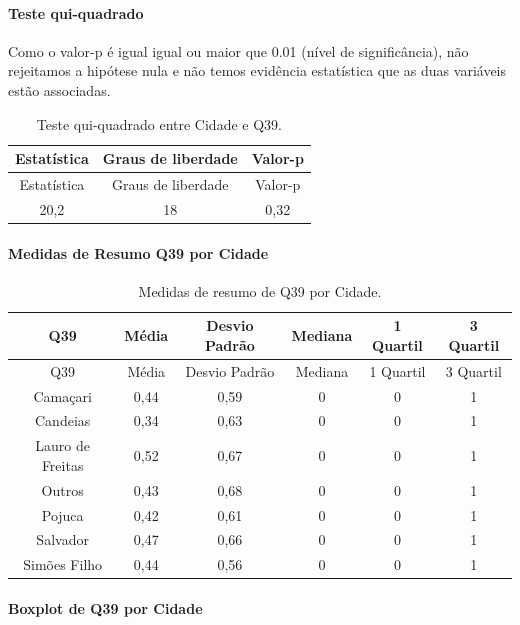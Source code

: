 \documentclass[]{article}
\let\oldparagraph\paragraph
\renewcommand{\paragraph}[1]{\oldparagraph{#1}\mbox{}}
\begin{document}
\hypertarget{teste-qui-quadrado-127}{%
\paragraph{Teste qui-quadrado}\label{teste-qui-quadrado-127}}

Como o valor-p é igual igual ou maior que 0.01 (nível de significância), não rejeitamos a hipótese nula e não temos evidência estatística que as duas variáveis estão associadas.

\begin{longtable}[]{@{}ccc@{}}
\caption{\label{tab:unnamed-chunk-1491}Teste qui-quadrado entre Cidade e Q39.}\tabularnewline
\toprule
Estatística & Graus de liberdade & Valor-p\tabularnewline
\midrule
\endfirsthead
\toprule
Estatística & Graus de liberdade & Valor-p\tabularnewline
\midrule
\endhead
20,2 & 18 & 0,32\tabularnewline
\bottomrule
\end{longtable}

\cleardoublepage

\hypertarget{medidas-de-resumo-q39-por-cidade}{%
\paragraph{Medidas de Resumo Q39 por Cidade}\label{medidas-de-resumo-q39-por-cidade}}

\begin{longtable}[]{@{}cccccc@{}}
\caption{\label{tab:unnamed-chunk-1492}Medidas de resumo de Q39 por Cidade.}\tabularnewline
\toprule
Q39 & Média & Desvio Padrão & Mediana & 1 Quartil & 3 Quartil\tabularnewline
\midrule
\endfirsthead
\toprule
Q39 & Média & Desvio Padrão & Mediana & 1 Quartil & 3 Quartil\tabularnewline
\midrule
\endhead
Camaçari & 0,44 & 0,59 & 0 & 0 & 1\tabularnewline
Candeias & 0,34 & 0,63 & 0 & 0 & 1\tabularnewline
Lauro de Freitas & 0,52 & 0,67 & 0 & 0 & 1\tabularnewline
Outros & 0,43 & 0,68 & 0 & 0 & 1\tabularnewline
Pojuca & 0,42 & 0,61 & 0 & 0 & 1\tabularnewline
Salvador & 0,47 & 0,66 & 0 & 0 & 1\tabularnewline
Simões Filho & 0,44 & 0,56 & 0 & 0 & 1\tabularnewline
\bottomrule
\end{longtable}

\hypertarget{boxplot-de-q39-por-cidade}{%
\paragraph{Boxplot de Q39 por Cidade}\label{boxplot-de-q39-por-cidade}}
\end{document}
